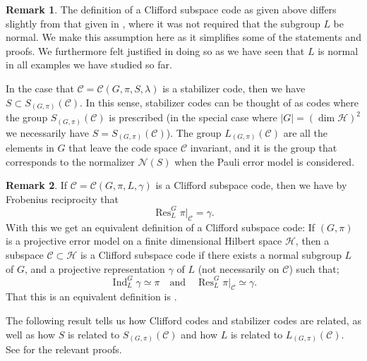 \documentclass[11pt]{article}
\theoremstyle{definition}
\newtheorem*{remark}{Remark}
\newcommand{\calC}{\mathcal{C}}
\newcommand{\calH}{\mathcal{H}}
\newcommand{\calN}{\mathcal{N}}
\newcommand{\Ind}{\operatorname{Ind}}
\newcommand{\Res}{\operatorname{Res}}
\begin{document}
\begin{remark}\label{rem:normality of L}
    The definition of a Clifford subspace code as given above differs slightly from that given in \cite[Definition 5.8]{Eidesen2025}, where it was not required that the subgroup $L$ be normal. We make this assumption here as it simplifies some of the statements and proofs. We furthermore felt justified in doing so as we have seen that $L$ is normal in all examples we have studied so far.

    In the case that $\calC = \calC(G,\pi,S,\lambda)$ is a stabilizer code, then we have $S \subset S_{(G,\pi)}(\calC)$. In this sense, stabilizer codes can be thought of as codes where the group $S_{(G,\pi)}(\calC)$ is prescribed (in the special case where $|G| = (\dim\calH)^2$ we necessarily have $S = S_{(G,\pi)}(\calC)$). The group $L_{(G,\pi)}(\calC)$ are all the elements in $G$ that leave the code space $\calC$ invariant, and it is the group that corresponds to the normalizer $\calN(S)$ when the Pauli error model is considered. 
\end{remark}

\begin{remark}\label{rem:clifford code of abstract rep}
    If $\calC = \calC(G,\pi,L,\gamma)$ is a Clifford subspace code, then we have by Frobenius reciprocity that
    \begin{equation}\label{eqn:clifford code representation}
        \Res^G_L\pi|_\calC = \gamma.
    \end{equation}
    With this we get an equivalent definition of a Clifford subspace code: If $(G,\pi)$ is a projective error model on a finite dimensional Hilbert space $\calH$, then a subspace $\calC \subset \calH$ is a Clifford subspace code if there exists a normal subgroup $L$ of $G$, and a projective representation $\gamma$ of $L$ (not necessarily on $\calC$) such that;
    \begin{equation*}
        \Ind_L^G\gamma \simeq \pi \quad \text{and} \quad \Res^G_L\pi|_\calC \simeq \gamma.
    \end{equation*}
    That this is an equivalent definition is \cite[Proposition 5.10]{Eidesen2025}.
\end{remark}

The following result tells us how Clifford codes and stabilizer codes are related, as well as how $S$ is related to $S_{(G,\pi)}(\calC)$ and how $L$ is related to $L_{(G,\pi)}(\calC)$. See \cite[Proposition 5.12, Theorem 6.3, Proposition 6.7]{Eidesen2025} for the relevant proofs.
\end{document}
